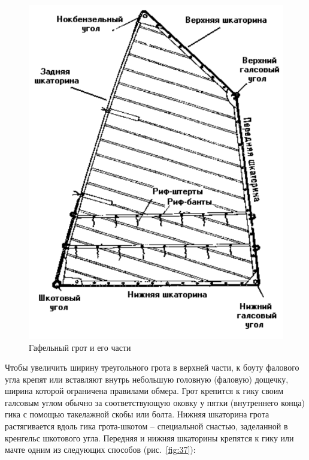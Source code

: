 \documentclass[a4paper, 12pt, twoside, final]{scrbook}
\begin{document}
\begin{figure}[htbp]
\begin{centering}
\includegraphics{pics/Gafelnyj_grot}
\par\end{centering}

\protect\caption{\label{fig:36}Гафельный
грот и его части}
\end{figure}


Чтобы увеличить ширину треугольного грота в верхней части, к боуту
фалового угла крепят или вставляют внутрь небольшую головную (фаловую)
дощечку, ширина которой ограничена правилами обмера. Грот крепится
к гику своим галсовым углом обычно за соответствующую оковку у пятки
(внутреннего конца) гика с помощью такелажной скобы или болта. Нижняя
шкаторина грота растягивается вдоль гика грота-шкотом \--- специальной
снастью, заделанной в кренгельс шкотового угла. Передняя и нижняя
шкаторины крепятся к гику или мачте одним из следующих способов (рис.~\ref{fig:37}):
\end{document}
